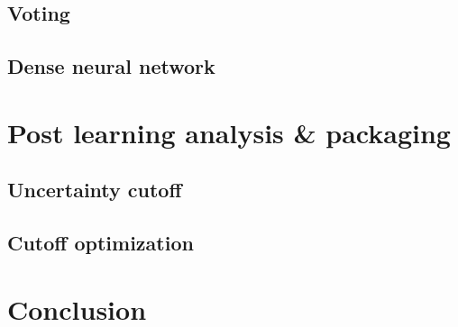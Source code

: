 \documentclass[preprint,aps,nofootinbib,a4paper,superscriptaddress,longbibliography,amsfonts,amssymb,amsmath,titlepage]{revtex4-2}
\begin{document}
\subsection{Voting}


\subsection{Dense neural network}

\section{Post learning analysis \& packaging}


\subsection{Uncertainty cutoff}


\subsection{Cutoff optimization}


\section{Conclusion}

\end{document}
